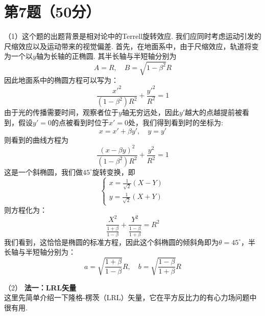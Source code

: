 \documentclass{ctexart}
\begin{document}
\section*{第7题（50分）}
\noindent （1）这个题的出题背景是相对论中的Terrell旋转效应. 我们应同时考虑运动引发的尺缩效应以及运动带来的视觉偏差. 首先，在地面系中，由于尺缩效应，轨道将变为一个以$y$轴为长轴的正椭圆. 其半长轴与半短轴分别为
\begin{equation}
A=R,\quad B=\sqrt{1-\beta^2}R \tag{7.1}
\end{equation}
因此地面系中的椭圆方程可以写为：
\begin{equation}
  \frac{x'^2}{(1-\beta^2)R^2}+\frac{y'^2}{R^2}=1 \tag{7.2}
  \end{equation}
由于光的传播需要时间，观察者位于$y$轴无穷远处，因此$y'$越大的点越提前被看到，假设$y'=0$的点被看到时位于$x'=0$处，我们得到看到时的坐标为:
\begin{equation}
  x=x'+\beta y',\quad y=y' \tag{7.3}
\end{equation}
则看到的曲线方程为
\begin{equation}
  \frac{(x-\beta y)^2}{(1-\beta^2)R^2}+\frac{y^2}{R^2}=1 \tag{7.4}
  \end{equation}
这是一个斜椭圆，我们做$45^\circ$旋转变换，即
\begin{equation}
  \begin{cases}
    \displaystyle
x=\frac{1}{\sqrt{2}}(X-Y)\\
    \displaystyle
y=\frac{1}{\sqrt{2}}(X+Y)
  \end{cases}\tag{7.5}
  \end{equation}
则方程化为：
\begin{equation}
\displaystyle\frac{X^2}{\frac{1+\beta}{1-\beta}}+\frac{Y^2}{\frac{1-\beta}{1+\beta}}=R^2 \tag{7.6}
\end{equation}
我们看到，这恰恰是椭圆的标准方程，因此这个斜椭圆的倾斜角即为$\theta=45^\circ$，半长轴与半短轴分别为：
\begin{equation}
a=\sqrt{\frac{1+\beta}{1-\beta}}R,\quad b=\sqrt{\frac{1-\beta}{1+\beta}}R \tag{7.7}
\end{equation}


\noindent （2）
\noindent \textbf{法一：LRL矢量}\\
这里先简单介绍一下隆格-楞茨（LRL）矢量，它在平方反比力的有心力场问题中很有用.\\
\end{document}
